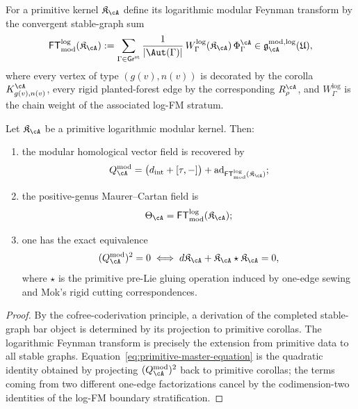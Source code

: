 \begin{construction}
\label{constr:primitive-kernel-feynman-transform}
For a primitive kernel $\mathfrak K_\cA$ define its logarithmic modular
Feynman transform by the convergent stable-graph sum
\begin{equation}
\label{eq:primitive-kernel-feynman-transform}
\mathsf{FT}^{\log}_{\mathrm{mod}}(\mathfrak K_\cA)
:=
\sum_{\Gamma\in\mathsf{Gr}^{\mathrm{st}}}
\frac{1}{|\Aut(\Gamma)|}
\,W^{\log}_{\Gamma}(\mathfrak K_\cA)\,\Phi^{\cA}_{\Gamma}
\in
\mathfrak g^{\mathrm{mod,log}}_{\cA}(\mathfrak U),
\end{equation}
where every vertex of type $(g(v),n(v))$ is decorated by the corolla
$K^{\cA}_{g(v),n(v)}$, every rigid planted-forest edge by the corresponding
$R^{\cA}_{\rho}$, and $W^{\log}_{\Gamma}$ is the chain weight of the associated
log-FM stratum.
\end{construction}

\begin{theorem}
\label{thm:primitive-to-global-reconstruction}
Let $\mathfrak K_\cA$ be a primitive logarithmic modular kernel.
Then:
\begin{enumerate}[label=\textup{(\roman*)}]
\item the modular homological vector field is recovered by
\[
Q^{\mathrm{mod}}_{\cA}
=
\bigl(d_{\mathrm{int}}+[\tau,-]\bigr)
+
\operatorname{ad}_{\mathsf{FT}^{\log}_{\mathrm{mod}}(\mathfrak K_\cA)};
\]
\item the positive-genus Maurer--Cartan field is
\[
\Theta_\cA=\mathsf{FT}^{\log}_{\mathrm{mod}}(\mathfrak K_\cA);
\]
\item one has the exact equivalence
\begin{equation}
\label{eq:primitive-master-equation}
(Q^{\mathrm{mod}}_{\cA})^2=0
\iff
d\mathfrak K_\cA+\mathfrak K_\cA\star\mathfrak K_\cA=0,
\end{equation}
where $\star$ is the primitive pre-Lie gluing operation induced by
one-edge sewing and Mok's rigid cutting correspondences.
\end{enumerate}
\end{theorem}

\begin{proof}
By the cofree-coderivation principle, a derivation of the completed stable-graph
bar object is determined by its projection to primitive corollas.  The logarithmic
Feynman transform is precisely the extension from primitive data to all stable
graphs.  Equation~\eqref{eq:primitive-master-equation} is the quadratic identity
obtained by projecting $(Q^{\mathrm{mod}}_{\cA})^2$ back to primitive corollas; the
terms coming from two different one-edge factorizations cancel by the codimension-two
identities of the log-FM boundary stratification.
\end{proof}

